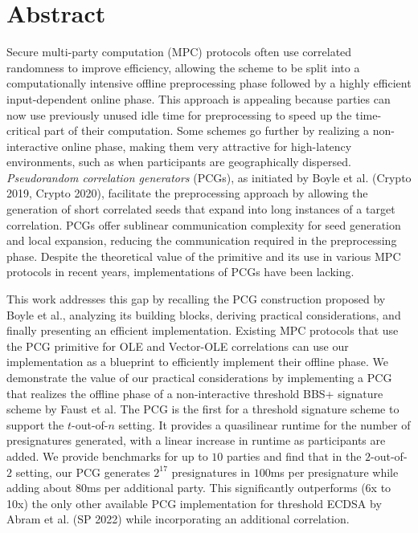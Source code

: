 \section*{Abstract}
Secure multi-party computation (MPC) protocols often use correlated randomness to improve efficiency, allowing the scheme to be split into a computationally intensive offline preprocessing phase followed by a highly efficient input-dependent online phase. This approach is appealing because parties can now use previously unused idle time for preprocessing to speed up the time-critical part of their computation. Some schemes go further by realizing a non-interactive online phase, making them very attractive for high-latency environments, such as when participants are geographically dispersed. \textit{Pseudorandom correlation generators} (PCGs), as initiated by Boyle et al. (Crypto 2019, Crypto 2020), facilitate the preprocessing approach by allowing the generation of short correlated seeds that expand into long instances of a target correlation. PCGs offer sublinear communication complexity for seed generation and local expansion, reducing the communication required in the preprocessing phase. Despite the theoretical value of the primitive and its use in various MPC protocols in recent years, implementations of PCGs have been lacking.

This work addresses this gap by recalling the PCG construction proposed by Boyle et al., analyzing its building blocks, deriving practical considerations, and finally presenting an efficient implementation. Existing MPC protocols that use the PCG primitive for OLE and Vector-OLE correlations can use our implementation as a blueprint to efficiently implement their offline phase. We demonstrate the value of our practical considerations by implementing a PCG that realizes the offline phase of a non-interactive threshold BBS+ signature scheme by Faust et al. The PCG is the first for a threshold signature scheme to support the $t$-out-of-$n$ setting. It provides a quasilinear runtime for the number of presignatures generated, with a linear increase in runtime as participants are added. We provide benchmarks for up to $10$ parties and find that in the $2$-out-of-$2$ setting, our PCG generates $2^{17}$ presignatures in $100$ms per presignature while adding about $80$ms per additional party. This significantly outperforms (6x to 10x) the only other available PCG implementation for threshold ECDSA by Abram et al. (SP 2022) while incorporating an additional correlation.
